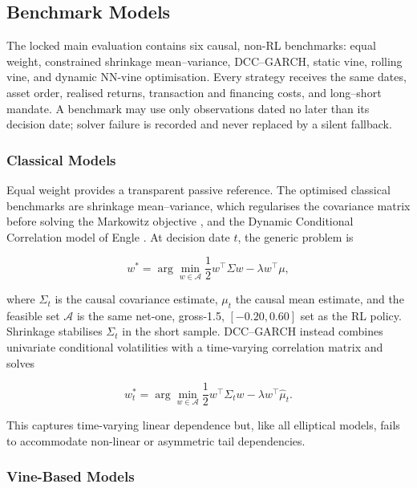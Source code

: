 \subsection{Benchmark Models}
\label{subsec:3_benchmark_models}

The locked main evaluation contains six causal, non-RL benchmarks: equal weight, constrained shrinkage mean--variance, DCC--GARCH, static vine, rolling vine, and dynamic NN-vine optimisation. Every strategy receives the same dates, asset order, realised returns, transaction and financing costs, and long--short mandate. A benchmark may use only observations dated no later than its decision date; solver failure is recorded and never replaced by a silent fallback.

\subsubsection{Classical Models}
\label{subsubsec:3_classical_models}

Equal weight provides a transparent passive reference. The optimised classical benchmarks are shrinkage mean--variance, which regularises the covariance matrix before solving the Markowitz objective \cite{markowitz_portfolio_1952}, and the Dynamic Conditional Correlation model of Engle \cite{engle_dynamic_2002}. At decision date $t$, the generic problem is

\begin{equation}
w^* = \arg\min_{w \in \mathcal{A}} \frac{1}{2} w^\top \Sigma w - \lambda w^\top \mu,
\label{eq:markowitz_constrained}
\end{equation}

where $\Sigma_t$ is the causal covariance estimate, $\mu_t$ the causal mean estimate, and the feasible set $\mathcal A$ is the same net-one, gross-1.5, $[-0.20,0.60]$ set as the RL policy. Shrinkage stabilises $\Sigma_t$ in the short sample. DCC--GARCH instead combines univariate conditional volatilities with a time-varying correlation matrix and solves

\begin{equation}
w_t^* = \arg\min_{w \in \mathcal{A}} \frac{1}{2} w^\top \Sigma_t w - \lambda w^\top \hat{\mu}_t.
\end{equation}

This captures time-varying linear dependence but, like all elliptical models, fails to accommodate non-linear or asymmetric tail dependencies.

\subsubsection{Vine-Based Models}
\label{subsubsec:3_vine_based_models}

